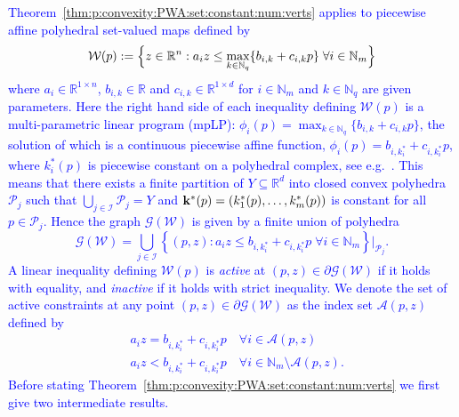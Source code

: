 \documentclass[smallextended]{svjour3}       %
\numberwithin{equation}{section}
\newcommand{\revision}[1]{\textcolor{blue}{#1}}
\begin{document}
\revision{Theorem~\ref{thm:p:convexity:PWA:set:constant:num:verts} applies to piecewise affine polyhedral set-valued maps defined by
\begin{equation}\label{eq:definition:PWA:polytopic:set:general}
  \mathcal W(p) := \Bigl\{z\in\mathbb R^n: a_i z \leq \max_{k\in\mathbb N_q}\{b_{i,k} + c_{i,k}p\} \; \forall i\in\mathbb N_m \Bigr\} 
\end{equation}
where $a_i\in\mathbb R^{1\times n}$, $b_{i,k} \in \mathbb R$ and $c_{i,k} \in \mathbb R^{1\times d}$ for $i\in\mathbb N_m$ and $k\in\mathbb N_q$ are given parameters.
Here the right hand side of each inequality defining $\mathcal W(p)$ is a multi-parametric linear program (mpLP):  $\phi_i(p) = \max_{k\in\mathbb N_q} \{b_{i,k} + c_{i,k}p\}$,
the solution of which is a continuous piecewise affine function, $\phi_i(p) = b_{i,k^\ast_i} + c_{i,k^\ast_i}p$, where $k^\ast_i(p)$ is piecewise constant on a polyhedral complex, see e.g.~\cite{spjotvold07}.
%
This means that there exists a finite partition of $Y\subseteq\mathbb R^d$ into closed convex polyhedra 
$\mathcal P_j$ such that $\bigcup_{j\in\mathcal I} \mathcal P_j = Y$ and 
${\bf{k}}^\ast(p) = (k_1^\ast(p),\dots,k_m^\ast(p))$ is constant for all $p \in \mathcal P_j$.
%
Hence the graph $\mathscr G(\mathcal W)$ is given by a finite union of polyhedra
%
\begin{equation*}
  \mathscr G(\mathcal W) = \bigcup_{j\in\mathcal I} \left\{(p,z): a_i z \leq b_{i,k_i^\ast} + c_{i,k_i^\ast}p \; \forall i \in\mathbb N_m \right\}\bigr\vert_{\mathcal P_{j}} .
\end{equation*}
A linear inequality defining $\mathcal W(p)$ is \emph{active} at $(p,z)\in\partial\mathscr G (\mathcal W)$ if it holds with equality, and \emph{inactive} if it holds with strict inequality. We denote the set of active constraints at any point $(p,z)\in\partial\mathscr G (\mathcal W)$ as the index set $\mathcal A (p,z)$ defined by
\begin{align*}
&a_i z = b_{i,k_i^\ast} + c_{i,k_i^\ast} p \quad\forall i \in \mathcal A (p,z) \\
&a_i z < b_{i,k_i^\ast} + c_{i,k_i^\ast} p \quad \forall i \in \mathbb N_m \setminus \mathcal A (p,z) .
\end{align*}
Before stating Theorem~\ref{thm:p:convexity:PWA:set:constant:num:verts} we first give two intermediate results.}
 
\end{document}
